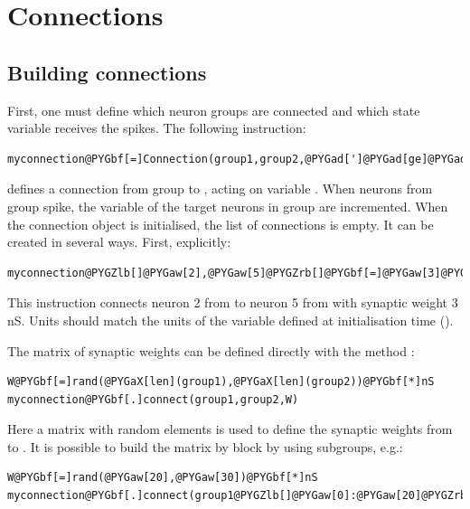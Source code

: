\documentclass[letterpaper,10pt,english]{manual}
\begin{document}
\section{Connections}


\subsection{Building connections}

First, one must define which neuron groups are connected and which state variable receives the spikes.
The following instruction:

\begin{Verbatim}[commandchars=@\[\]]
myconnection@PYGbf[=]Connection(group1,group2,@PYGad[']@PYGad[ge]@PYGad['])
\end{Verbatim}

defines a connection from group  to , acting on variable . When
neurons from group  spike, the variable  of the target neurons in group
 are incremented. When the connection object is initialised, the list of connections
is empty. It can be created in several ways. First, explicitly:

\begin{Verbatim}[commandchars=@\[\]]
myconnection@PYGZlb[]@PYGaw[2],@PYGaw[5]@PYGZrb[]@PYGbf[=]@PYGaw[3]@PYGbf[*]nS
\end{Verbatim}

This instruction connects neuron 2 from  to neuron 5 from  with synaptic weight
3 nS. Units should match the units of the variable defined at initialisation time ().

The matrix of synaptic weights can be defined directly with the method :

\begin{Verbatim}[commandchars=@\[\]]
W@PYGbf[=]rand(@PYGaX[len](group1),@PYGaX[len](group2))@PYGbf[*]nS
myconnection@PYGbf[.]connect(group1,group2,W)
\end{Verbatim}

Here a matrix with random elements is used to define the synaptic weights from 
to . It is possible to build the matrix by block by using subgroups, e.g.:

\begin{Verbatim}[commandchars=@\[\]]
W@PYGbf[=]rand(@PYGaw[20],@PYGaw[30])@PYGbf[*]nS
myconnection@PYGbf[.]connect(group1@PYGZlb[]@PYGaw[0]:@PYGaw[20]@PYGZrb[],group2@PYGZlb[]@PYGaw[10]:@PYGaw[40]@PYGZrb[],W@PYGbf[=]W)
\end{Verbatim}
\end{document}
